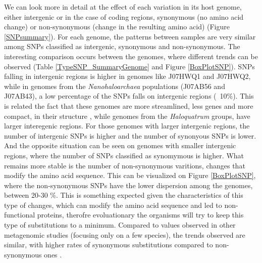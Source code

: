 We can look more in detail at the effect of each variation in its host genome, either intergenic or in the case of coding regions, synonymous (no amino acid change) or non-synonymous (change in the resulting amino acid) (Figure \ref{SNPsummary}). For each genome, the patterns between samples are very similar among SNPs classified as intergenic, synonymous and non-synonymous. The interesting comparison occurs between the genomes, where different trends can be observed (Table \ref{TypeSNP_SummaryGenome} and Figure \ref{BoxPlotSNP}). SNPs falling in intergenic regions is higher in genomes like J07HWQ1 and J07HWQ2, while in genomes from the \textit{Nanohaloarchaea} populations (J07AB56 and J07AB43), a low percentage of the SNPs falls on intergenic regions (~10\%). This is related the fact that these genomes are more streamlined, less genes and more compact, in their structure \cite{Narasingarao:2012kp}, while genomes from the \textit{Haloquatrum} groups, have larger interegenic regions. For those genomes with larger intergenic regions, the number of intergenic SNPs is higher and the number of synonyous SNPs is lower. And the opposite situation can be seen on genomes with smaller intergenic regions, where the number of SNPs classified as synomymous is higher. What remains more stable is the number of non-synonymous varitions, changes that modify the amino acid sequence. This can be visualized on Figure \ref{BoxPlotSNP}, where the non-synonymous SNPs have the lower dispersion among the genomes, between 20-30 \%. This is something expected given the characteristics of this type of changes, which can modify the amino acid sequence and led to non-functional proteins, therofre evoluationary the organisms will try to keep this type of substitutions to a minimum. Compared to values observed in other metagenomic studies (focusing only on a few species), the trends observed are similar, with higher rates of synonymous substitutions compared to non-synonymous ones \cite{Simmons:2008by}.

